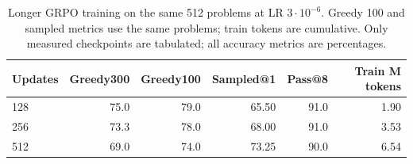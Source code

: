 \begin{table}[t]
\centering
\caption{Longer GRPO training on the same 512 problems at LR $3\cdot 10^{-6}$. Greedy 100 and sampled metrics use the same problems; train tokens are cumulative. Only measured checkpoints are tabulated; all accuracy metrics are percentages.}
\label{tab:duration}
\footnotesize
\setlength{\tabcolsep}{4pt}
\begin{tabular}{lrrrrr}
\toprule
Updates & Greedy300 & Greedy100 & Sampled@1 & Pass@8 & Train M tokens\\
\midrule
128 & 75.0 & 79.0 & 65.50 & 91.0 & 1.90\\
256 & 73.3 & 78.0 & 68.00 & 91.0 & 3.53\\
512 & 69.0 & 74.0 & 73.25 & 90.0 & 6.54\\
\bottomrule
\end{tabular}
\end{table}
